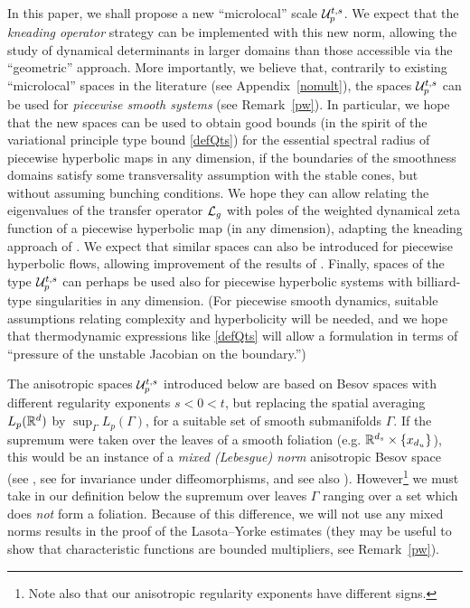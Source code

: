 \documentclass[10pt,twoside]{amsart}
\begin{document}
 In this paper, we shall
propose a new ``microlocal'' scale $\mathcal{U}^{t,s}_p$. 
We expect that the {\it kneading operator} strategy \cite{BT2} can be implemented with this new norm, allowing  the study of dynamical
determinants in larger domains than those accessible via the ``geometric'' approach.
More importantly, we believe that, contrarily
to existing ``microlocal'' spaces  in the literature  
(see Appendix~\ref{nomult}),
the spaces $\mathcal{U}^{t,s}_p$ can be used for  {\it piecewise smooth systems}
 (see Remark~\ref{pw}). In particular,
we hope that the new spaces can be used to obtain good bounds
(in the spirit of the variational principle type
bound \eqref{defQts}) for the essential spectral
radius of piecewise hyperbolic maps in any dimension, if
the boundaries of the smoothness domains satisfy some
transversality assumption with the stable cones, but without assuming bunching
conditions. We hope they can allow 
relating the eigenvalues of the transfer operator
$\mathcal{L}_g$ with poles of the weighted dynamical zeta function of a piecewise  hyperbolic
map  (in any dimension), adapting the kneading approach of \cite{BaRu, BT2}.
We expect that similar spaces can also be introduced for piecewise hyperbolic flows,  allowing
improvement of the results of \cite{BLiv}. Finally,
spaces of the type $\mathcal{U}^{t,s}_p$ can perhaps be used also for piecewise  hyperbolic systems with billiard-type singularities
in any dimension. (For piecewise smooth dynamics, suitable  assumptions 
relating complexity and hyperbolicity will be needed, and we hope
that thermodynamic expressions like \eqref{defQts} will allow  a formulation
in terms of ``pressure of the unstable Jacobian on the boundary.'')




The anisotropic spaces $\mathcal{U}^{t,s}_p$ introduced below are based on Besov spaces 
with different regularity exponents $s<0<t$, but replacing the spatial averaging $L_p(\mathbb{R}^d)$  by
 $\sup_\Gamma L_p(\Gamma)$, for a suitable set
of smooth submanifolds $\Gamma$. If the supremum
were taken over the leaves of a smooth foliation (e.g. $\mathbb{R}^{d_s} \times \{x_{d_u}\}$), this 
would be an instance 
of  a  {\it mixed (Lebesgue) norm} anisotropic Besov 
space (see \cite{BIN}, see \cite{JMHS} for invariance under diffeomorphisms, and see also
\cite{BeNu, Nu}).
However\footnote{Note also that our anisotropic regularity exponents have different signs.} 
we must take in our definition below the supremum over leaves $\Gamma$ ranging  over a set 
which does {\it not} form a foliation.  Because
of this difference, we will not use any mixed norms results  in the proof of
the Lasota--Yorke estimates (they may be useful to show that characteristic functions
are bounded multipliers, see Remark~\ref{pw}).
\end{document}
